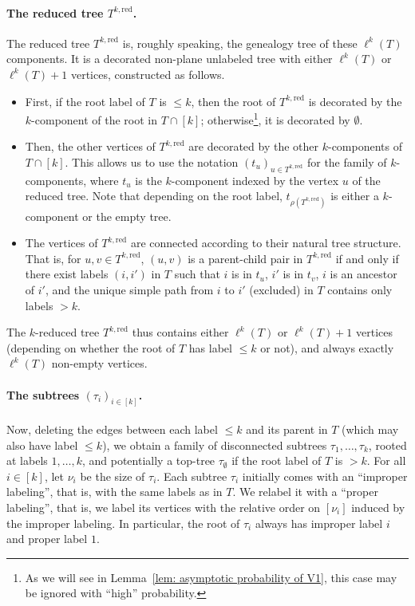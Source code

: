 \documentclass{article}
\theoremstyle{remark}
\newcommand{\red}{\mathrm{red}}
\begin{document}
\paragraph{The reduced tree $T^{k,\red}$.}

The reduced tree $T^{k,\red}$ is, roughly speaking, the genealogy tree of these $\ell^{k}(T)$ components. 
It is a decorated non-plane unlabeled tree with either $\ell^k(T)$ or $\ell^k(T)+1$ vertices, constructed as follows. 
\begin{itemize}
    \item First, if the root label of $T$ is $\le k$, then the root of $T^{k,\red}$ is decorated by the $k$-component of the root in $T\cap[k]$; otherwise\footnote{
    As we will see in Lemma~\ref{lem: asymptotic probability of V1}, this case may be ignored with ``high'' probability.
    }, it is decorated by $\emptyset$.
    \item Then, the other vertices of $T^{k,\red}$ are decorated by the other $k$-components of $T \cap [k]$. 
    This allows us to use the notation $(t_u)_{u \in T^{k,\red}}$ for the family of $k$-components, where $t_u$ is the $k$-component indexed by the vertex $u$ of the reduced tree.
    Note that depending on the root label, $t_{\rho(T^{k,\red})}$ is either a $k$-component or the empty tree.
    \item The vertices of $T^{k,\red}$ are connected according to their natural tree structure. 
    That is, for $u,v \in T^{k,\red}$, $(u,v)$ is a parent-child pair in $T^{k,\red}$ if and only if there exist labels $(i,i')$ in $T$ such that $i$ is in $t_u$, $i'$ is in $t_v$, $i$ is an ancestor of $i'$, and the unique simple path from $i$ to $i'$ (excluded) in $T$ contains only labels $>k$.
\end{itemize}

The $k$-reduced tree $T^{k,\red}$ thus contains either $\ell^{k}(T)$ or $\ell^{k}(T)+1$ vertices (depending on whether the root of $T$ has label $\leq k$ or not), and always exactly $\ell^{k}(T)$ non-empty vertices.

\paragraph{The subtrees $(\tau_i)_{i \in [k]}$.}

Now, deleting the edges between each label $\le k$ and its parent in $T$ (which may also have label $\le k$), we obtain a family of disconnected subtrees $\tau_1, \dots, \tau_k$, rooted at labels $1, \dots, k$, and potentially a top-tree $\tau_\emptyset$ if the root label of $T$ is $> k$.
For all $i \in [k]$, let $\nu_i$ be the size of $\tau_i$.
Each subtree $\tau_i$ initially comes with an \enquote{improper labeling}, that is, with the same labels as in $T$.
We relabel it with a \enquote{proper labeling}, that is, we label its vertices with the relative order on $[\nu_i]$ induced by the improper labeling.
In particular, the root of $\tau_i$ always has improper label $i$ and proper label $1$.
\end{document}
